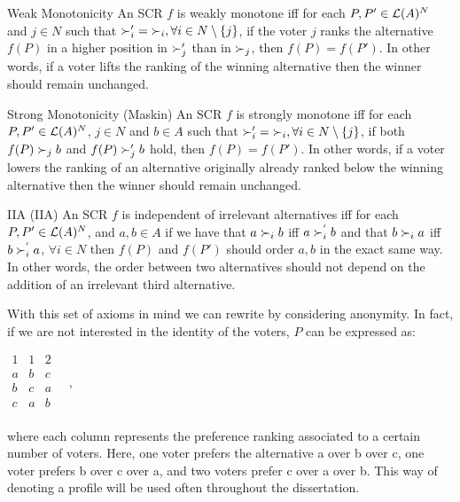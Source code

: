 	\begin{genthm}{Weak Monotonicity}
		An \acs{SCR} $f$ is weakly monotone iff for each $P, P' \in\mathcal{L}(A)^{N}$ and $j \in N$ such that $\mathbin{\pref}'_i=\mathbin{\prefi}, \forall i \in {N \setminus\{j\}}$, if the voter $j$ ranks the alternative $f(P)$ in a higher position in $\mathbin{\succ}'_j$ than in $\mathbin{\succ}_j$, then $f(P)=f(P')$.
		In other words, if a voter lifts the ranking of the winning alternative then the winner should remain unchanged. 
	\end{genthm}

	\begin{genthm}{Strong Monotonicity (Maskin)}
	An \acs{SCR} $f$ is strongly monotone iff for each $P, P' \in\mathcal{L}(A)^{N}$, $j \in N$ and $b \in A$ such that $\mathbin{\pref}'_i=\mathbin{\prefi}, \forall i \in {N \setminus\{j\}}$, if both $f(P)\succ_j b$ and $f(P)\succ'_j b$ hold, then $f(P)=f(P')$.
	In other words, if a voter lowers the ranking of an alternative originally already ranked below the winning alternative then the winner should remain unchanged. 
	\end{genthm}

	\begin{genthm}{\acl{IIA} (\acs{IIA})}
	An \acs{SCR} $f$ is independent of irrelevant alternatives iff for each $P, P' \in\mathcal{L}(A)^{N}$, and $a,b \in A$ if we have that $a \prefi b$ iff $a \succ^{'}_{i} b$ and that $b \prefi a$ iff $b \succ^{'}_{i} a$, $\forall i \in N$ then $f(P)$ and $f(P')$ should order $a,b$ in the exact same way. 
	In other words, the order between two alternatives should not depend on the addition of an irrelevant third alternative.
	\end{genthm}
	
	\begin{example}
		\label{ex:anonymousprofile}
		With this set of axioms in mind we can rewrite  by considering anonymity. In fact, if we are not interested in the identity of the voters, $P$ can be expressed as:
		\begin{center}
			$
			\begin{array}{ccc}
				1 & 1 & 2 \\
				a &	b & c \\
				b &	c & a \\
				c &	a & b \\
			\end{array} \quad, 
			$
		\end{center}
		where each column represents the preference ranking associated to a certain number of voters. Here, one voter prefers the alternative a over b over c, one voter prefers b over c over a, and two voters prefer c over a over b. 
		This way of denoting a profile will be used often throughout the dissertation.
	\end{example}

